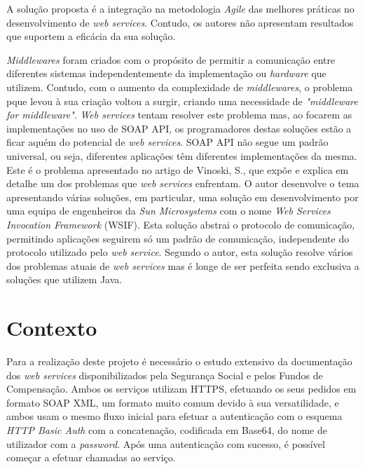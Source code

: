 \documentclass[sigplan]{acmart}
\begin{document}
A solução proposta é a integração na metodologia \textit{Agile} das melhores práticas no desenvolvimento de \textit{web services}. Contudo, os autores não apresentam resultados que suportem a eficácia da sua solução.

\textit{Middlewares} foram criados com o propósito de permitir a comunicação entre diferentes sistemas independentemente da implementação ou \textit{hardware} que utilizem. Contudo, com o aumento da complexidade de \textit{middlewares}, o problema pque levou à sua criação voltou a surgir, criando uma necessidade de \textit{"middleware for middleware"}\cite{vinoskiMiddleware}. \textit{Web services} tentam resolver este problema mas, ao focarem as implementações no uso de SOAP API, os programadores destas soluções estão a ficar aquém do potencial de \textit{web services}. SOAP API não segue um padrão universal, ou seja, diferentes aplicações têm diferentes implementações da mesma. Este é o problema apresentado no artigo de Vinoski, S.\cite{vinoskiIntegration}, que expõe e explica em detalhe um dos problemas que \textit{web services} enfrentam. O autor desenvolve o tema apresentando várias soluções, em particular, uma solução em desenvolvimento por uma equipa de engenheiros da \textit{Sun Microsystems} com o nome \textit{Web Services Invocation Framework} (WSIF). Esta solução abstrai o protocolo de comunicação, permitindo aplicações seguirem só um padrão de comunicação, independente do protocolo utilizado pelo \textit{web service}. Segundo o autor, esta solução resolve vários dos problemas atuais de \textit{web services} mas é longe de ser perfeita sendo exclusiva a soluções que utilizem Java.

\section{Contexto} \label{sec:data}

Para a realização deste projeto é necessário o estudo extensivo da documentação dos \textit{web services} disponibilizados pela Segurança Social e pelos Fundos de Compensação. Ambos os serviços utilizam HTTPS, efetuando os seus pedidos em formato SOAP XML, um formato muito comum devido à sua versatilidade, e ambos usam o mesmo fluxo inicial para efetuar a autenticação com o esquema \textit{HTTP Basic Auth} com a concatenação, codificada em Base64, do nome de utilizador com a \textit{password}. Após uma autenticação com sucesso, é possível começar a efetuar chamadas ao serviço.
\end{document}
